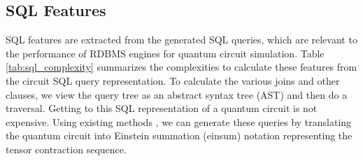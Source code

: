 \subsection{SQL Features}
\label{ssec:sql}
SQL features are extracted from the generated SQL queries, which are relevant to the performance of RDBMS engines for quantum circuit simulation. 
 Table \ref{tab:sql_complexity}  summarizes the complexities to calculate these features from the circuit SQL query representation. To calculate the various joins and other clauses, we view the query tree as an abstract syntax tree (AST) and then do a traversal. Getting to this SQL representation of a quantum circuit is not expensive. Using existing methods \cite{Littau_2025, hai2025quantum}, we can generate these queries by translating the quantum circuit into Einstein summation (einsum) notation representing the tensor contraction sequence.

